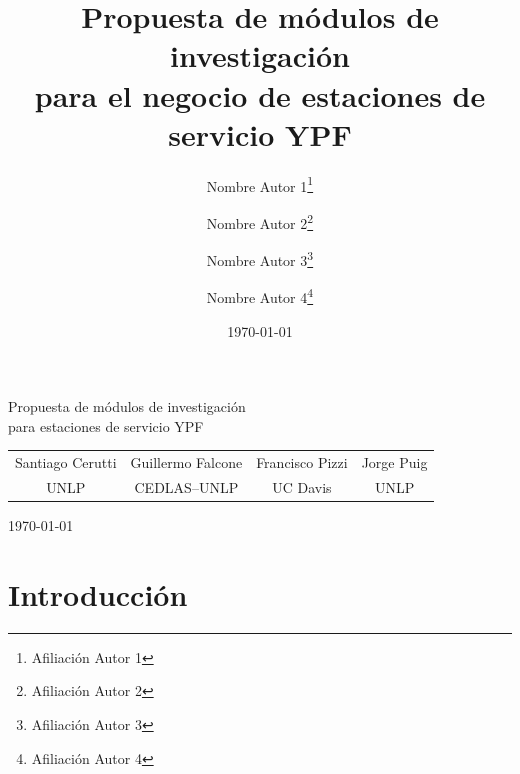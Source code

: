 \documentclass[12pt]{article}
\title{\textbf{Propuesta de módulos de investigación\\
para el negocio de estaciones de servicio YPF}}
\author{
  Nombre Autor 1\thanks{Afiliación Autor 1} \and
  Nombre Autor 2\thanks{Afiliación Autor 2} \and
  Nombre Autor 3\thanks{Afiliación Autor 3} \and
  Nombre Autor 4\thanks{Afiliación Autor 4}
}
\date{\today}
\begin{document}
\makeempresarialcover
  {Propuesta de módulos de investigación\\para estaciones de servicio YPF}
  {
    \begin{tabular}{cccc}
    \large Santiago Cerutti &
    \large Guillermo Falcone &
    \large Francisco Pizzi &
    \large Jorge Puig \\[0.3cm]
    \normalsize UNLP &
    \normalsize CEDLAS--UNLP &
    \normalsize UC Davis &
    \normalsize UNLP
    \end{tabular}
  }
  {\today}


\tableofcontents
\newpage


\section{Introducción}




\end{document}
